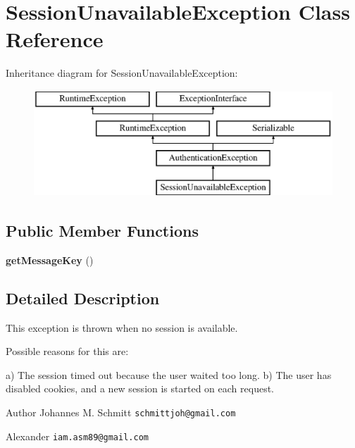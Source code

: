 \section{Session\+Unavailable\+Exception Class Reference}
\label{class_symfony_1_1_component_1_1_security_1_1_core_1_1_exception_1_1_session_unavailable_exception}
Inheritance diagram for Session\+Unavailable\+Exception\+:\begin{figure}[H]
\begin{center}
\leavevmode
\includegraphics[height=4.000000cm]{class_symfony_1_1_component_1_1_security_1_1_core_1_1_exception_1_1_session_unavailable_exception}
\end{center}
\end{figure}
\subsection*{Public Member Functions}
\begin{DoxyCompactItemize}
\item 
{\bf get\+Message\+Key} ()
\end{DoxyCompactItemize}


\subsection{Detailed Description}
This exception is thrown when no session is available.

Possible reasons for this are\+: \begin{DoxyVerb}a) The session timed out because the user waited too long.
b) The user has disabled cookies, and a new session is started on each
   request.
\end{DoxyVerb}


\begin{DoxyAuthor}{Author}
Johannes M. Schmitt {\tt schmittjoh@gmail.\+com} 

Alexander {\tt iam.\+asm89@gmail.\+com} 
\end{DoxyAuthor}


